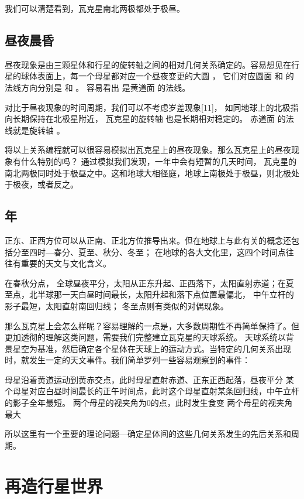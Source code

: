\documentclass[a4paper,10.5pt]{book}
\begin{document}
我们可以清楚看到，瓦克星南北两极都处于极昼。

\section{昼夜晨昏}

昼夜现象是由三颗星体和行星的旋转轴之间的相对几何关系确定的。容易想见在行星的球体表面上，每一个母星都对应一个昼夜变更的大圆 ，
它们对应圆面   和   的法线方向分别是    和   。 容易看出   是黄道面   的法线。

对比于昼夜现象的时间周期，我们可以不考虑岁差现象[11]， 如同地球上的北极指向长期保持在北极星附近， 瓦克星的旋转轴  也是长期相对稳定的。
赤道面   的法线就是旋转轴  。

将以上关系编程就可以很容易模拟出瓦克星上的昼夜现象。那么瓦克星上的昼夜现象有什么特别的吗？ 通过模拟我们发现，一年中会有短暂的几天时间，
瓦克星的南北两极同时处于极昼之中。这和地球大相径庭，地球上南极处于极昼，则北极处于极夜，或者反之。

\section{年}

正东、正西方位可以从正南、正北方位推导出来。但在地球上与此有关的概念还包括分至四时—春分、夏至、秋分、冬至；
在地球的各大文化里，这四个时间点往往有重要的天文与文化含义。

在春秋分点， 全球昼夜平分，太阳从正东升起、正西落下，太阳直射赤道；在夏至点，北半球那一天白昼时间最长，太阳升起和落下点位置最偏北，
中午立杆的影子最短，太阳直射南回归线； 冬至点则有类似的对偶现象。

那么瓦克星上会怎么样呢？容易理解的一点是，大多数周期性不再简单保持了。但更加透彻的理解这类问题，需要我们完整建立瓦克星的天球系统。
天球系统以背景星空为基准，然后确定各个星体在天球上的运动方式。当特定的几何关系出现时，就发生一定的天文事件。我们简单罗列一些容易观察到的事件：

母星沿着黄道运动到黄赤交点，此时母星直射赤道、正东正西起落，昼夜平分
某个母星对应白昼时间最长的正午时间点，此时这个母星直射某条回归线，中午立杆的影子全年最短。
两个母星的视夹角为0的点，此时发生食变
两个母星的视夹角最大

所以这里有一个重要的理论问题—确定星体间的这些几何关系发生的先后关系和周期。




\chapter{再造行星世界}
\end{document}
